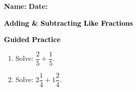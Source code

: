 \documentclass[12pt, letterpaper, fleqn]{article}
\begin{document}
\textbf{Name:} \underline{\hspace{5cm}}
\hfill
\textbf{Date:} \underline{\hspace{3cm}}\\

\begin{tcolorbox}[colback=customteal!20]
    \large\textcolor{black}{\textbf{Adding & Subtracting Like Fractions}}
\end{tcolorbox}
\newpage
\begin{tcolorbox}[colback=customteal!20]
    \large\textcolor{black}{\textbf{Guided Practice}}
\end{tcolorbox}
\begin{enumerate}[itemsep=3.5cm, leftmargin=0.6cm]
\item Solve: $\dfrac{2}{5} + \dfrac{1}{5}$.
\vspace{3cm}
\item Solve: $2\dfrac{1}{4} + 1\dfrac{2}{4}$.
\end{enumerate}
\end{document}
